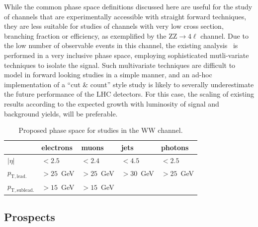 While the common phase space definitions discussed here are useful for the study of channels that are experimentally accessible with straight forward techniques, they are less suitable for studies of channels with very low cross section, branching fraction or efficiency, as exemplified by the ZZ$\rightarrow 4\ell$ channel. Due to the low number of observable events in this channel, the existing analysis~\cite{CMS-PAS-SMP-17-006} is performed in a very inclusive phase space, employing sophisticated mutli-variate techniques to isolate the signal. Such multivariate techniques are difficult to model in forward looking studies in a simple manner, and an ad-hoc implementation of a  ``cut \& count'' style study is likely to severally underestimate the future performance of the LHC detectors. For this case, the scaling of existing results according to the expected growth with luminosity of signal and background yields, will be preferable.

\begin{table}[htb]
\centering
\begin{tabular}{|l|l|l|l|l|}
    \hline
             & electrons & muons & jets & photons \\
    \hline
    $|\eta|$ & $<2.5$  & $<2.4$ & $<4.5$ & $<2.5$ \\
    $p_\mathrm{T,lead.}$ & $>25$~GeV & $>25$~GeV &$>30$~GeV &$>25$~GeV\\
    $p_\mathrm{T,sublead.}$ & $>15$~GeV & $>15$~GeV &&\\                            
    \hline
  \end{tabular}  

\caption{\label{tab:wg2:phasespace} Proposed phase space for studies in the WW channel.}
\end{table}

\subsection{Prospects}

